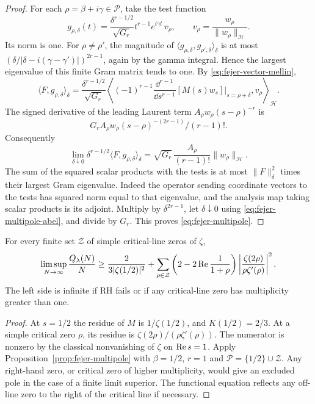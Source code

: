 \begin{proof}
For each \(\rho=\beta+i\gamma\in\mathcal P\), take the test
function
\[
 g_{\rho,\delta}(t)=\frac{\delta^{r-1/2}}{\sqrt{G_r}}
    t^{r-1} e^{i\gamma t}\,v_\rho,
 \qquad v_\rho=\frac{w_\rho}{\|w_\rho\|_{\mathcal H}}.
\]
Its norm is one. For \(\rho\ne\rho'\), the magnitude of
\(\langle g_{\rho,\delta},g_{\rho',\delta}\rangle_\delta\)
is at most
\((\delta/|\delta-i(\gamma-\gamma')|)^{2r-1}\), again by
the gamma integral. Hence the largest eigenvalue of this finite
Gram matrix tends to one. By \eqref{eq:fejer-vector-mellin},
\[
 \langle F,g_{\rho,\delta}\rangle_\delta
  =\frac{\delta^{r-1/2}}{\sqrt{G_r}}
  \left\langle
   (-1)^{r-1}\frac{\dd^{r-1}}{\dd s^{r-1}}
           [M(s)w_s]\bigg|_{s=\rho+\delta},v_\rho
  \right\rangle_{\mathcal H}.
\]
The signed derivative of the leading Laurent term
\(A_\rho w_\rho(s-\rho)^{-r}\) is
\[G_r A_\rho w_\rho(s-\rho)^{-(2r-1)}/(r-1)!.\]
Consequently
\[
 \lim_{\delta\downarrow0}\delta^{r-1/2}
       \langle F,g_{\rho,\delta}\rangle_\delta
   =\sqrt{G_r}\,\frac{A_\rho}{(r-1)!}\|w_\rho\|_{\mathcal H}.
\]
The sum of the squared scalar products with the tests is at
most \(\|F\|_\delta^2\) times their largest Gram eigenvalue.
Indeed the operator sending coordinate vectors to the tests
has squared norm equal to that eigenvalue, and the analysis
map taking scalar products is its adjoint. Multiply by
\(\delta^{2r-1}\), let \(\delta\downarrow0\) using
\eqref{eq:fejer-multipole-abel}, and divide by \(G_r\).
This proves \eqref{eq:fejer-multipole}.
\end{proof}

\begin{corollary}\label{cor:fejer-critical-poles}
For every finite set \(\mathcal Z\) of simple critical-line
zeros of \(\zeta\),
\begin{equation}\label{eq:fejer-critical-poles}
 \limsup_{N\to\infty}\frac{Q_\lambda(N)}N
 \ge\frac{2}{3|\zeta(1/2)|^2}
 +\sum_{\rho\in\mathcal Z}
   \left(2-2\operatorname{Re}\frac1{1+\rho}\right)
   \left|\frac{\zeta(2\rho)}{\rho\zeta'(\rho)}\right|^2.
\end{equation}
The left side is infinite if RH fails or if any critical-line
zero has multiplicity greater than one.
\end{corollary}

\begin{proof}
At \(s=1/2\) the residue of \(M\) is \(1/\zeta(1/2)\),
and \(K(1/2)=2/3\). At a simple critical zero \(\rho\), its
residue is \(\zeta(2\rho)/(\rho\zeta'(\rho))\). The numerator
is nonzero by the classical nonvanishing of \(\zeta\) on
\(\operatorname{Re} s=1\). Apply Proposition~\ref{prop:fejer-multipole} with
\(\beta=1/2\), \(r=1\) and \(\mathcal P=\{1/2\}\cup\mathcal Z\).
Any right-hand zero, or critical zero of higher multiplicity,
would give an excluded pole in the case of a finite limit
superior. The functional equation reflects any off-line zero
to the right of the critical line if necessary.
\end{proof}


